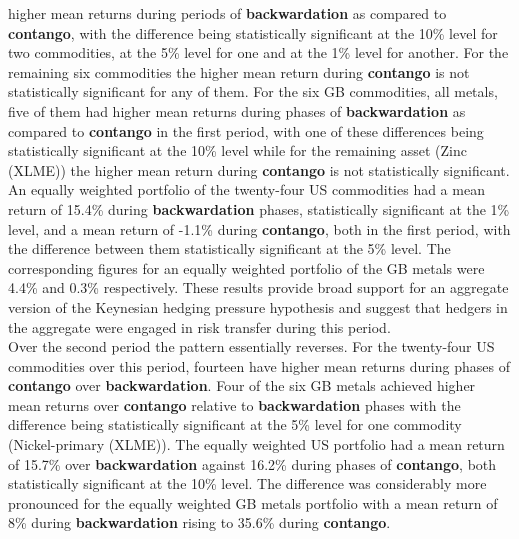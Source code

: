\documentclass[
  authoryear,
  preprint,
  3p]{elsarticle}
\begin{document}
higher mean returns during periods of \textbf{backwardation} as compared
to \textbf{contango}, with the difference being statistically
significant at the 10\% level for two commodities, at the 5\% level for
one and at the 1\% level for another. For the remaining six commodities
the higher mean return during \textbf{contango} is not statistically
significant for any of them. For the six GB commodities, all metals,
five of them had higher mean returns during phases of
\textbf{backwardation} as compared to \textbf{contango} in the first
period, with one of these differences being statistically significant at
the 10\% level while for the remaining asset (Zinc (XLME)) the higher
mean return during \textbf{contango} is not statistically significant.
An equally weighted portfolio of the twenty-four US commodities had a
mean return of 15.4\% during \textbf{backwardation} phases,
statistically significant at the 1\% level, and a mean return of -1.1\%
during \textbf{contango}, both in the first period, with the difference
between them statistically significant at the 5\% level. The
corresponding figures for an equally weighted portfolio of the GB metals
were 4.4\% and 0.3\% respectively. These results provide broad support
for an aggregate version of the Keynesian hedging pressure hypothesis
and suggest that hedgers in the aggregate were engaged in risk transfer
during this period.\\
Over the second period the pattern essentially reverses. For the
twenty-four US commodities over this period, fourteen have higher mean
returns during phases of \textbf{contango} over \textbf{backwardation}.
Four of the six GB metals achieved higher mean returns over
\textbf{contango} relative to \textbf{backwardation} phases with the
difference being statistically significant at the 5\% level for one
commodity (Nickel-primary (XLME)). The equally weighted US portfolio had
a mean return of 15.7\% over \textbf{backwardation} against 16.2\%
during phases of \textbf{contango}, both statistically significant at
the 10\% level. The difference was considerably more pronounced for the
equally weighted GB metals portfolio with a mean return of 8\% during
\textbf{backwardation} rising to 35.6\% during \textbf{contango}.

\medskip
\end{document}

